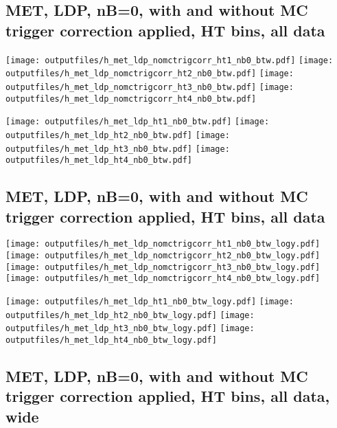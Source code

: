 \documentclass[11pt]{article}
\begin{document}
    \clearpage
     \subsection{ MET, LDP, nB=0, with and without MC trigger correction applied, HT bins, all data}

    \noindent
     \texttt{[image: outputfiles/h\_met\_ldp\_nomctrigcorr\_ht1\_nb0\_btw.pdf]}
     \texttt{[image: outputfiles/h\_met\_ldp\_nomctrigcorr\_ht2\_nb0\_btw.pdf]}
     \texttt{[image: outputfiles/h\_met\_ldp\_nomctrigcorr\_ht3\_nb0\_btw.pdf]}
     \texttt{[image: outputfiles/h\_met\_ldp\_nomctrigcorr\_ht4\_nb0\_btw.pdf]}

    \noindent
     \texttt{[image: outputfiles/h\_met\_ldp\_ht1\_nb0\_btw.pdf]}
     \texttt{[image: outputfiles/h\_met\_ldp\_ht2\_nb0\_btw.pdf]}
     \texttt{[image: outputfiles/h\_met\_ldp\_ht3\_nb0\_btw.pdf]}
     \texttt{[image: outputfiles/h\_met\_ldp\_ht4\_nb0\_btw.pdf]}

    \clearpage
     \subsection{ MET, LDP, nB=0, with and without MC trigger correction applied, HT bins, all data}

    \noindent
     \texttt{[image: outputfiles/h\_met\_ldp\_nomctrigcorr\_ht1\_nb0\_btw\_logy.pdf]}
     \texttt{[image: outputfiles/h\_met\_ldp\_nomctrigcorr\_ht2\_nb0\_btw\_logy.pdf]}
     \texttt{[image: outputfiles/h\_met\_ldp\_nomctrigcorr\_ht3\_nb0\_btw\_logy.pdf]}
     \texttt{[image: outputfiles/h\_met\_ldp\_nomctrigcorr\_ht4\_nb0\_btw\_logy.pdf]}

    \noindent
     \texttt{[image: outputfiles/h\_met\_ldp\_ht1\_nb0\_btw\_logy.pdf]}
     \texttt{[image: outputfiles/h\_met\_ldp\_ht2\_nb0\_btw\_logy.pdf]}
     \texttt{[image: outputfiles/h\_met\_ldp\_ht3\_nb0\_btw\_logy.pdf]}
     \texttt{[image: outputfiles/h\_met\_ldp\_ht4\_nb0\_btw\_logy.pdf]}

    \clearpage
     \subsection{ MET, LDP, nB=0, with and without MC trigger correction applied, HT bins, all data, wide}
\end{document}
